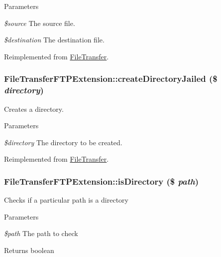 \begin{DoxyParams}{Parameters}
\item[{\em \$source}]The source file. \item[{\em \$destination}]The destination file. \end{DoxyParams}


Reimplemented from \hyperlink{classFileTransfer_a9ca65dc0107476d044cf18c0873f4a90}{FileTransfer}.\hypertarget{classFileTransferFTPExtension_af1114a1f88335b964727c9ac73cc7a27}{
\subsubsection[{createDirectoryJailed}]{\setlength{\rightskip}{0pt plus 5cm}FileTransferFTPExtension::createDirectoryJailed (\$ {\em directory})}}
\label{classFileTransferFTPExtension_af1114a1f88335b964727c9ac73cc7a27}
Creates a directory.


\begin{DoxyParams}{Parameters}
\item[{\em \$directory}]The directory to be created. \end{DoxyParams}


Reimplemented from \hyperlink{classFileTransfer_a585c6cfab189aabbee70a624a50af975}{FileTransfer}.\hypertarget{classFileTransferFTPExtension_a6d067cfbdb848b76fa576c755572777f}{
\subsubsection[{isDirectory}]{\setlength{\rightskip}{0pt plus 5cm}FileTransferFTPExtension::isDirectory (\$ {\em path})}}
\label{classFileTransferFTPExtension_a6d067cfbdb848b76fa576c755572777f}
Checks if a particular path is a directory


\begin{DoxyParams}{Parameters}
\item[{\em \$path}]The path to check\end{DoxyParams}
\begin{DoxyReturn}{Returns}
boolean 
\end{DoxyReturn}


